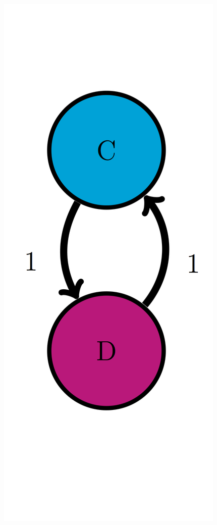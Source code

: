 \documentclass[
  letterpaper,
  DIV=11,
  numbers=noendperiod]{scrreprt}
\begin{document}
\includegraphics{./ch10/CD_trans_diag.png}
\end{document}
